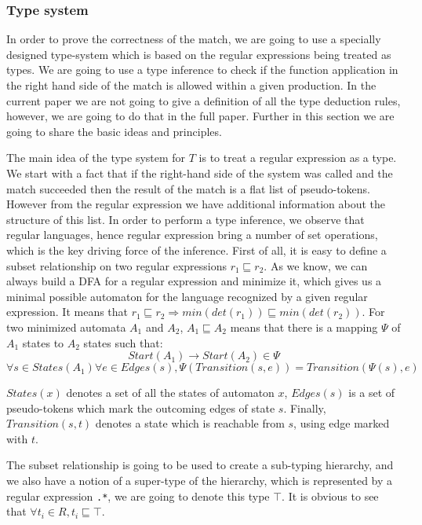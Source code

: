 \subsubsection{Type system}
In order to prove the correctness of the match, we are going to use
a specially designed type-system which is based on the regular 
expressions being treated as types.  We are going to use a type
inference to check if the function application in the right hand
side of the match is allowed within a given production.  In the
current paper we are not going to give a definition of all the
type deduction rules, however, we are going to do that in the 
full paper.  Further in this section we are going to share the
basic ideas and principles.

The main idea of the type system for $T$ is to treat a regular
expression as a type.  We start with a fact that if the 
right-hand side of the system was called and the match succeeded
then the result of the match is a flat list of pseudo-tokens.
However from the regular expression we have additional information
about the structure of this list.  In order to perform a type 
inference, we observe that regular languages, hence regular 
expression bring a number of set operations, which is the key
driving force of the inference.  First of all, it is easy to
define a subset relationship on two regular expressions
$r_1 \sqsubseteq r_2$.  As we know, we can always build a DFA for
a regular expression and minimize it, which gives us a minimal
possible automaton for the language recognized by a given regular
expression.  It means that $r_1 \sqsubseteq r_2 \Rightarrow 
min (det (r_1)) \sqsubseteq min (det (r_2))$.  For two minimized 
automata $A_1$ and $A_2$, $A_1 \sqsubseteq A_2$ means that there
is a mapping $\Psi$ of $A_1$ states to $A_2$ states such that:
\[
    Start (A_1) \to Start (A_2) \in \Psi
\]
\[
    \forall s \in States (A_1) \forall e \in Edges (s),
    \Psi (Transition (s, e)) = Transition (\Psi (s), e)
\]

$States (x)$ denotes a set of all the states of automaton $x$,
$Edges (s)$ is a set of pseudo-tokens which mark the outcoming
edges of state $s$.  Finally, $Transition (s, t)$ denotes a
state which is reachable from $s$, using edge marked with $t$.

The subset relationship is going to be used to create a sub-typing
hierarchy, and we also have a notion of a super-type of
the hierarchy, which is represented by a regular expression \verb|.*|,
we are going to denote this type $\top$.  It is obvious to see that
$\forall t_i \in R, t_i \sqsubseteq \top$.

